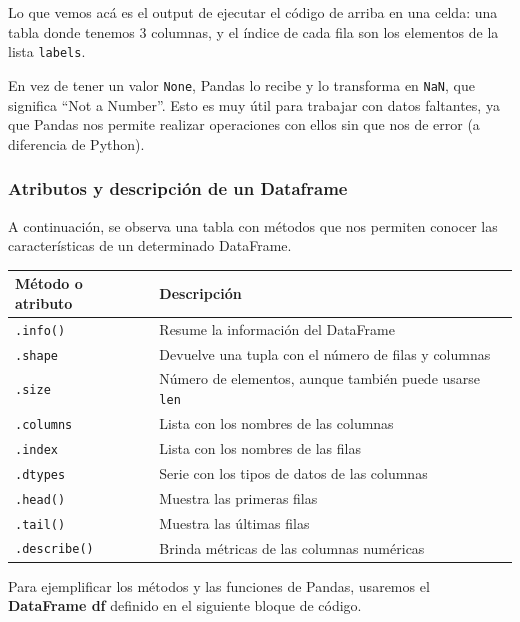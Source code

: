 \documentclass[
  letterpaper,
  DIV=11,
  numbers=noendperiod]{scrreprt}
\begin{document}
Lo que vemos acá es el output de ejecutar el código de arriba en una
celda: una tabla donde tenemos 3 columnas, y el índice de cada fila son
los elementos de la lista \texttt{labels}.

En vez de tener un valor \texttt{None}, Pandas lo recibe y lo transforma
en \texttt{NaN}, que significa ``Not a Number''. Esto es muy útil para
trabajar con datos faltantes, ya que Pandas nos permite realizar
operaciones con ellos sin que nos de error (a diferencia de Python).

\subsubsection{Atributos y descripción de un
Dataframe}\label{atributos-y-descripciuxf3n-de-un-dataframe}

A continuación, se observa una tabla con métodos que nos permiten
conocer las características de un determinado DataFrame.

\begin{longtable}[]{@{}ll@{}}
\toprule\noalign{}
Método o atributo & Descripción \\
\midrule\noalign{}
\endhead
\bottomrule\noalign{}
\endlastfoot
\texttt{.info()} & Resume la información del DataFrame \\
\texttt{.shape} & Devuelve una tupla con el número de filas y
columnas \\
\texttt{.size} & Número de elementos, aunque también puede usarse
\texttt{len} \\
\texttt{.columns} & Lista con los nombres de las columnas \\
\texttt{.index} & Lista con los nombres de las filas \\
\texttt{.dtypes} & Serie con los tipos de datos de las columnas \\
\texttt{.head()} & Muestra las primeras filas \\
\texttt{.tail()} & Muestra las últimas filas \\
\texttt{.describe()} & Brinda métricas de las columnas numéricas \\
\end{longtable}

Para ejemplificar los métodos y las funciones de Pandas, usaremos el
\textbf{DataFrame df} definido en el siguiente bloque de código.
\end{document}
